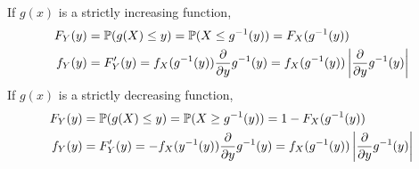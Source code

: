 \documentclass{huhtakm-template-book}
\newcommand{\prob}{\mathbb{P}}
\begin{document}
    \begin{proofing}
        If $g(x)$ is a strictly increasing function,
        \begin{align*}
            F_{Y}(y)&=\prob(g(X)\leq y)=\prob(X\leq g^{-1}(y))=F_{X}(g^{-1}(y))\\
            f_{Y}(y)&=F_{Y}'(y)=f_{X}(g^{-1}(y))\pdv*{g^{-1}(y)}{y}=f_{X}(g^{-1}(y))\abs{\pdv*{g^{-1}(y)}{y}}
        \end{align*}
        If $g(x)$ is a strictly decreasing function,
        \begin{align*}
            F_{Y}(y)&=\prob(g(X)\leq y)=\prob(X\geq g^{-1}(y))=1-F_{X}(g^{-1}(y))\\
            f_{Y}(y)&=F_{Y}'(y)=-f_{X}(y^{-1}(y))\pdv*{g^{-1}(y)}{y}=f_{X}(g^{-1}(y))\abs{\pdv*{g^{-1}(y)}{y}}
        \end{align*}
    \end{proofing}
\end{document}
